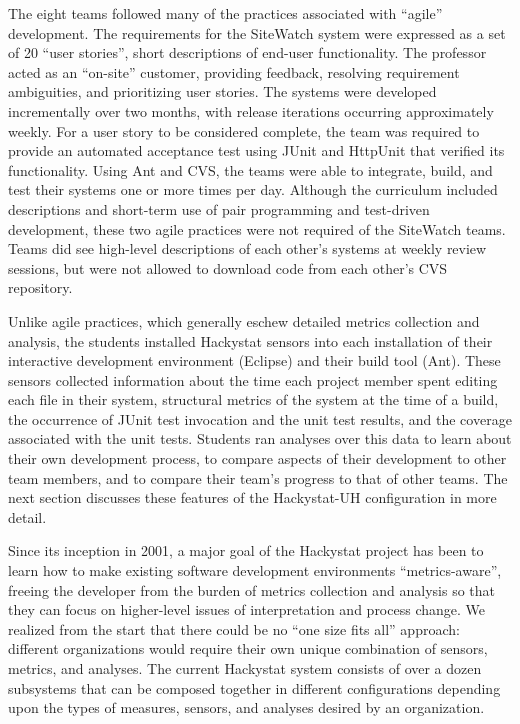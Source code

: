 \documentclass[10pt,twocolumn]{article}
\begin{document}
The eight teams followed many of the practices associated with ``agile''
development. The requirements for the SiteWatch system were expressed as a
set of 20 ``user stories'', short descriptions of end-user functionality.
The professor acted as an ``on-site'' customer, providing feedback,
resolving requirement ambiguities, and prioritizing user stories. The
systems were developed incrementally over two months, with release
iterations occurring approximately weekly. For a user story to be
considered complete, the team was required to provide an automated
acceptance test using JUnit and HttpUnit that verified its functionality.
Using Ant and CVS, the teams were able to integrate, build, and test their
systems one or more times per day.  Although the curriculum included
descriptions and short-term use of pair programming and test-driven
development, these two agile practices were not required of the SiteWatch
teams.  Teams did see high-level descriptions of each other's systems at
weekly review sessions, but were not allowed to download code from each
other's CVS repository.

Unlike agile practices, which generally eschew detailed metrics collection
and analysis, the students installed Hackystat sensors into each
installation of their interactive development environment (Eclipse) and
their build tool (Ant).  These sensors collected information about the time
each project member spent editing each file in their system, structural
metrics of the system at the time of a build, the occurrence of JUnit test
invocation and the unit test results, and the coverage associated with the
unit tests. Students ran analyses over this data to learn about their own
development process, to compare aspects of their development to other team
members, and to compare their team's progress to that of other teams.  The
next section discusses these features of the Hackystat-UH configuration in
more detail.

\label{sec:hackystat-uh}

Since its inception in 2001, a major goal of the Hackystat project has been
to learn how to make existing software development environments
``metrics-aware'', freeing the developer from the burden of metrics
collection and analysis so that they can focus on higher-level issues of
interpretation and process change.  We realized from the start that there
could be no ``one size fits all'' approach: different organizations would
require their own unique combination of sensors, metrics, and analyses.
The current Hackystat system consists of over a dozen subsystems that can
be composed together in different configurations depending upon the types
of measures, sensors, and analyses desired by an organization.
\end{document}
